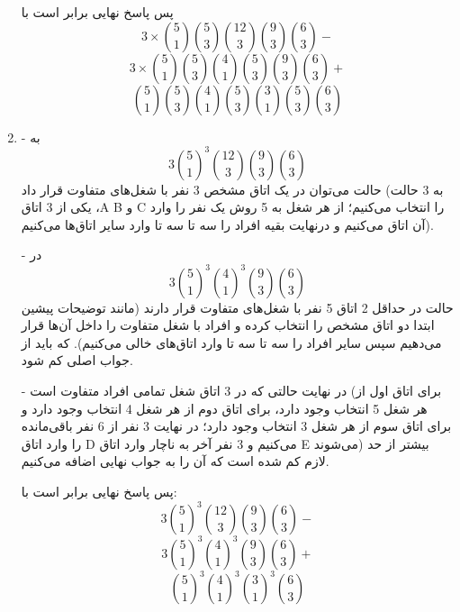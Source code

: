 \begin{enumerate}
    پس پاسخ نهایی برابر است با
    $$3\times\binom{5}{1}\binom{5}{3}\binom{12}{3}\binom{9}{3}\binom{6}{3}-$$
    $$3\times\binom{5}{1}\binom{5}{3}\binom{4}{1}\binom{5}{3}\binom{9}{3}\binom{6}{3}+$$
    $$\binom{5}{1}\binom{5}{3}\binom{4}{1}\binom{5}{3}\binom{3}{1}\binom{5}{3}\binom{6}{3}$$

    \item
    -
    به
    $$3\binom{5}{1}^3\binom{12}{3}\binom{9}{3}\binom{6}{3}$$
    حالت می‌توان در یک اتاق مشخص 3 نفر با شغل‌های متفاوت قرار داد (به 3 حالت یکی از 3 اتاق  ،A B و C را انتخاب می‌کنیم؛ از هر شغل به 5 روش یک نفر را وارد آن اتاق می‌کنیم و در‌نهایت بقیه افراد را سه تا سه تا وارد سایر اتاق‌ها می‌کنیم).

    -
    در
    $$3\binom{5}{1}^3\binom{4}{1}^3\binom{9}{3}\binom{6}{3}$$
    حالت در حداقل 2 اتاق 5 نفر با شغل‌های متفاوت قرار دارند (مانند توضیحات پیشین ابتدا دو اتاق مشخص را انتخاب کرده و افراد با شغل متفاوت را داخل آن‌ها قرار می‌دهیم سپس سایر افراد را سه تا سه تا وارد اتاق‌های خالی می‌کنیم). که باید از جواب اصلی کم شود.
    
    -
    در نهایت حالتی که در 3 اتاق شغل تمامی افراد متفاوت است (برای اتاق اول از هر شغل 5 انتخاب وجود دارد، برای اتاق دوم از هر شغل 4 انتخاب وجود دارد و برای اتاق سوم از هر شغل 3 انتخاب وجود دارد؛ در نهایت 3 نفر از 6 نفر باقی‌مانده را وارد اتاق D می‌کنیم و 3 نفر آخر به ناچار وارد اتاق E می‌شوند) بیشتر از حد لازم کم شده است که آن را به جواب نهایی اضافه می‌کنیم.
    
    پس پاسخ نهایی برابر است با:
    $$3\binom{5}{1}^3\binom{12}{3}\binom{9}{3}\binom{6}{3}-$$
    $$3\binom{5}{1}^3\binom{4}{1}^3\binom{9}{3}\binom{6}{3}+$$
    $$\binom{5}{1}^3\binom{4}{1}^3\binom{3}{1}^3\binom{6}{3}$$
\end{enumerate}
